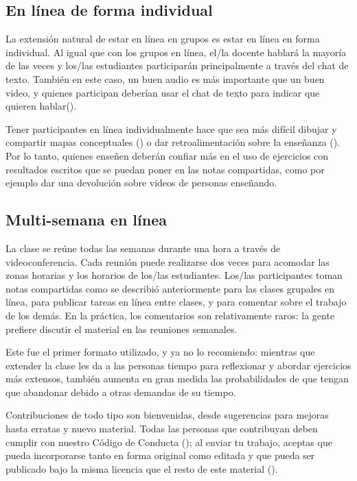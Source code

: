 \subsection*{En línea de forma individual}

La extensión natural de estar en línea en grupos es estar en línea en forma individual.
Al igual que con los grupos en línea,
el/la docente hablará la mayoría de las veces y los/las estudiantes participarán principalmente a través del chat de texto.
También en este caso, un buen audio es más importante que un buen video,
y quienes participan deberían usar el chat de texto para indicar que quieren hablar().

Tener participantes en línea individualmente hace que sea más difícil dibujar y compartir mapas conceptuales ()
o dar retroalimentación sobre la enseñanza ().
Por lo tanto, quienes enseñen deberán confiar más en el uso de ejercicios con resultados escritos que se puedan poner en las notas compartidas,
como por ejemplo dar una devolución sobre videos de personas enseñando.

\subsection*{Multi-semana en línea}

La clase se reúne todas las semanas durante una hora a través de videoconferencia.
Cada reunión puede realizarse dos veces para acomodar las zonas horarias y los horarios de los/las estudiantes.
Los/las participantes toman notas compartidas como se describió anteriormente para las clases grupales en línea,
para publicar tareas en línea entre clases,
y para comentar sobre el trabajo de los demás.
En la práctica,
los comentarios son relativamente raros:
la gente prefiere discutir el material en las reuniones semanales.

Este fue el primer formato utilizado,
y ya no lo recomiendo:
mientras que extender la clase les da a las personas tiempo para reflexionar y abordar ejercicios más extensos,
también aumenta en gran medida las probabilidades de que tengan que abandonar debido a otras demandas de su tiempo.


Contribuciones de todo tipo son bienvenidas,
desde sugerencias para mejoras hasta erratas y nuevo material.
Todas las personas que contribuyan deben cumplir con nuestro Código de Conducta ();
al enviar tu trabajo,
aceptas que pueda incorporarse tanto en forma original como editada
y que pueda ser publicado bajo la misma licencia que el resto de este material ().

